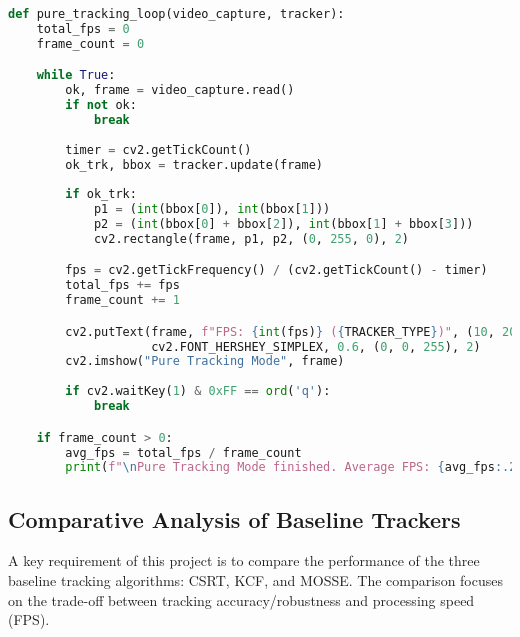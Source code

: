 \documentclass[12pt, a4paper]{article}
\begin{document}
\begin{lstlisting}[language=Python, caption={The pure tracking loop.}, label={lst:pure_loop}]
def pure_tracking_loop(video_capture, tracker):
    total_fps = 0
    frame_count = 0

    while True:
        ok, frame = video_capture.read()
        if not ok:
            break
            
        timer = cv2.getTickCount()
        ok_trk, bbox = tracker.update(frame)
        
        if ok_trk:
            p1 = (int(bbox[0]), int(bbox[1]))
            p2 = (int(bbox[0] + bbox[2]), int(bbox[1] + bbox[3]))
            cv2.rectangle(frame, p1, p2, (0, 255, 0), 2)

        fps = cv2.getTickFrequency() / (cv2.getTickCount() - timer)
        total_fps += fps
        frame_count += 1

        cv2.putText(frame, f"FPS: {int(fps)} ({TRACKER_TYPE})", (10, 20), 
                    cv2.FONT_HERSHEY_SIMPLEX, 0.6, (0, 0, 255), 2)
        cv2.imshow("Pure Tracking Mode", frame)
        
        if cv2.waitKey(1) & 0xFF == ord('q'):
            break

    if frame_count > 0:
        avg_fps = total_fps / frame_count
        print(f"\nPure Tracking Mode finished. Average FPS: {avg_fps:.2f}")
\end{lstlisting}

\subsection{Comparative Analysis of Baseline Trackers}
A key requirement of this project is to compare the performance of the three baseline tracking algorithms: CSRT, KCF, and MOSSE. The comparison focuses on the trade-off between tracking accuracy/robustness and processing speed (FPS).
\end{document}
